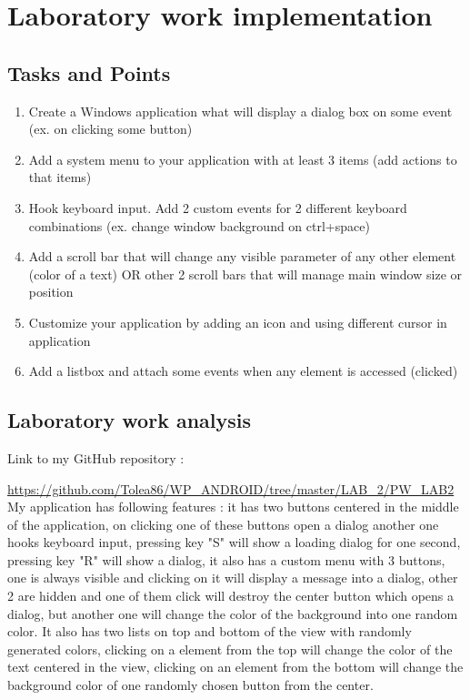 \section{Laboratory work implementation}

\subsection{Tasks and Points}

\begin{enumerate}

\item Create a Windows application what will display a dialog box on some event (ex. on clicking some button)
\item Add a system menu to your application with at least 3 items (add actions to that items)
\item Hook keyboard input. Add 2 custom events for 2 different keyboard combinations (ex. change window background on ctrl+space)
\item Add a scroll bar that will change any visible parameter of any other element (color of a text) OR other 2 scroll bars that will manage main window size or position
\item Customize your application by adding an icon and using different cursor in application
\item Add a listbox and attach some events when any element is accessed (clicked)

\end{enumerate}
\subsection{Laboratory work analysis}

Link to my GitHub repository : 

\url{https://github.com/Tolea86/WP_ANDROID/tree/master/LAB_2/PW_LAB2}\\

My application has following features : it has two buttons centered in the middle of the application, on clicking one of these buttons open a dialog another one hooks keyboard input, pressing key "S" will show a loading dialog for one second, pressing key "R" will show a dialog, it also has a custom menu with 3 buttons, one is always visible and clicking on it will display a message into a dialog, other 2 are hidden and one of them click will destroy the center button which opens a dialog, but another one will change the color of the background into one random color. It also has two lists on top and bottom of the view with randomly generated colors, clicking on a element from the top will change the color of the text centered in the view, clicking on an element from the bottom will change the background color of one randomly chosen button from the center.


